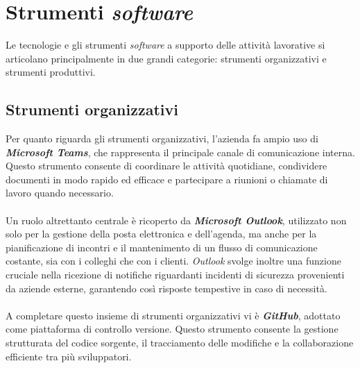 \section{Strumenti \textit{software}}  
Le tecnologie e gli strumenti \textit{software} a supporto delle attività lavorative si articolano principalmente in due grandi categorie: strumenti organizzativi e strumenti produttivi.  
\subsection{Strumenti organizzativi}  
Per quanto riguarda gli strumenti organizzativi, l'azienda fa ampio uso di \textbf{\textit{Microsoft Teams}}, che rappresenta il principale canale di comunicazione interna. Questo strumento consente di coordinare le attività quotidiane, condividere documenti in modo rapido ed efficace e partecipare a riunioni o chiamate di lavoro quando necessario.\\\\
Un ruolo altrettanto centrale è ricoperto da \textbf{\textit{Microsoft Outlook}}, utilizzato non solo per la gestione della posta elettronica e dell'agenda, ma anche per la pianificazione di incontri e il mantenimento di un flusso di comunicazione costante, sia con i colleghi che con i clienti. \textit{Outlook} svolge inoltre una funzione cruciale nella ricezione di notifiche riguardanti incidenti di sicurezza provenienti da aziende esterne, garantendo così risposte tempestive in caso di necessità.\\\\
A completare questo insieme di strumenti organizzativi vi è \textbf{\textit{GitHub}}, adottato come piattaforma di controllo versione. Questo strumento consente la gestione strutturata del codice sorgente, il tracciamento delle modifiche e la collaborazione efficiente tra più sviluppatori.  
